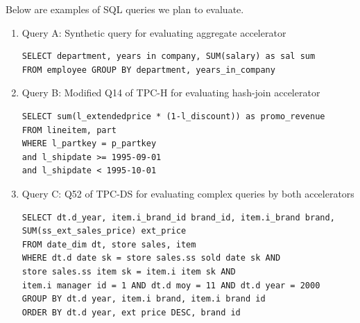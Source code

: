 \documentclass{article}
\begin{document}
Below are examples of SQL queries we plan to evaluate.

\begin{enumerate}

\item Query A: Synthetic query for evaluating aggregate accelerator 
\begin{verbatim}
SELECT department, years in company, SUM(salary) as sal sum
FROM employee GROUP BY department, years_in_company
\end{verbatim}

\item Query B: Modified Q14 of TPC-H for evaluating hash-join accelerator
\begin{verbatim}
SELECT sum(l_extendedprice * (1-l_discount)) as promo_revenue
FROM lineitem, part
WHERE l_partkey = p_partkey
and l_shipdate >= 1995-09-01 
and l_shipdate < 1995-10-01
\end{verbatim}

\item Query C: Q52 of TPC-DS for evaluating complex queries by both accelerators
\begin{verbatim}
SELECT dt.d_year, item.i_brand_id brand_id, item.i_brand brand,
SUM(ss_ext_sales_price) ext_price
FROM date_dim dt, store sales, item
WHERE dt.d date sk = store sales.ss sold date sk AND
store sales.ss item sk = item.i item sk AND
item.i manager id = 1 AND dt.d moy = 11 AND dt.d year = 2000
GROUP BY dt.d year, item.i brand, item.i brand id
ORDER BY dt.d year, ext price DESC, brand id
\end{verbatim}
\end{enumerate}



\end{document}
